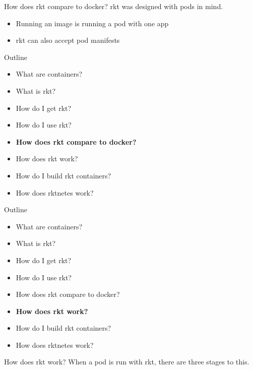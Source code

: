 \documentclass[pdf,aspectratio=169,14pt]{beamer}
\begin{document}
\begin{frame}{How does rkt compare to docker?}
    rkt was designed with pods in mind.
    \begin{itemize}
        \item Running an image is running a pod with one app
        \item rkt can also accept pod manifests
    \end{itemize}
\end{frame}


\begin{frame}
    Outline
    \begin{itemize}
        \item What are containers?
        \item What is rkt?
        \item How do I get rkt?
        \item How do I use rkt?
        \item \textbf{How does rkt compare to docker?}
        \item How does rkt work?
        \item How do I build rkt containers?
        \item How does rktnetes work?
    \end{itemize}
\end{frame}

\begin{frame}
    Outline
    \begin{itemize}
        \item What are containers?
        \item What is rkt?
        \item How do I get rkt?
        \item How do I use rkt?
        \item How does rkt compare to docker?
        \item \textbf{How does rkt work?}
        \item How do I build rkt containers?
        \item How does rktnetes work?
    \end{itemize}
\end{frame}

\begin{frame}{How does rkt work?}
    When a pod is run with rkt, there are three stages to this.
\end{frame}
\end{document}
